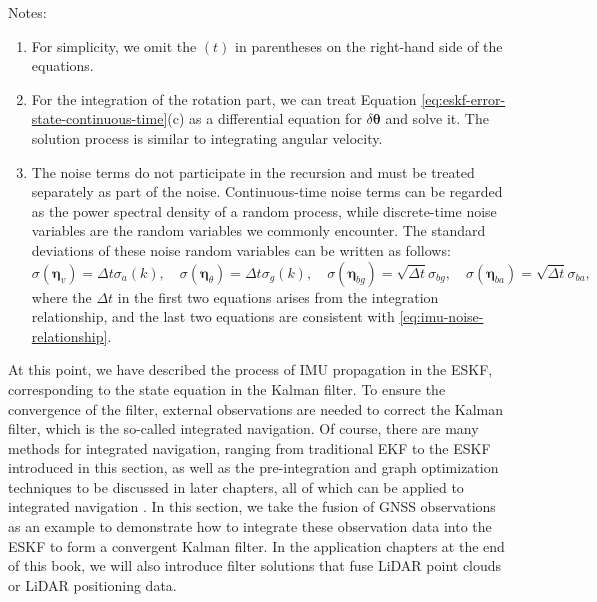 Notes:  
\begin{enumerate}  
	\item For simplicity, we omit the $(t)$ in parentheses on the right-hand side of the equations.  
	\item For the integration of the rotation part, we can treat Equation \eqref{eq:eskf-error-state-continuous-time}(c) as a differential equation for $\delta \boldsymbol{\theta}$ and solve it. The solution process is similar to integrating angular velocity.  
	\item The noise terms do not participate in the recursion and must be treated separately as part of the noise. Continuous-time noise terms can be regarded as the power spectral density of a random process, while discrete-time noise variables are the random variables we commonly encounter. The standard deviations of these noise random variables can be written as follows:  
	\begin{equation}\label{key}  
		\sigma(\boldsymbol{\eta}_v) = \Delta t \sigma_a(k), \quad \sigma(\boldsymbol{\eta}_{\theta}) =   
		\Delta t \sigma_{g}(k), \quad \sigma(\boldsymbol{\eta}_{bg}) = \sqrt{\Delta t} \sigma_{bg}, \quad   
		\sigma(\boldsymbol{\eta}_{ba}) = \sqrt{\Delta t} \sigma_{ba},  
	\end{equation}  
	where the $\Delta t$ in the first two equations arises from the integration relationship, and the last two equations are consistent with \eqref{eq:imu-noise-relationship}.  
\end{enumerate}  

At this point, we have described the process of IMU propagation in the ESKF, corresponding to the state equation in the Kalman filter. To ensure the convergence of the filter, external observations are needed to correct the Kalman filter, which is the so-called integrated navigation. Of course, there are many methods for integrated navigation, ranging from traditional EKF to the ESKF introduced in this section, as well as the pre-integration and graph optimization techniques to be discussed in later chapters, all of which can be applied to integrated navigation \cite{Wen2021}. In this section, we take the fusion of GNSS observations as an example to demonstrate how to integrate these observation data into the ESKF to form a convergent Kalman filter. In the application chapters at the end of this book, we will also introduce filter solutions that fuse LiDAR point clouds or LiDAR positioning data.

